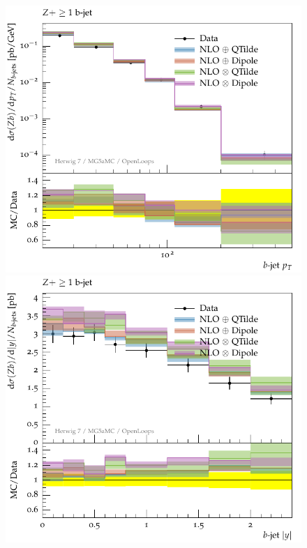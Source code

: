 \documentclass[11pt]{cernrep}
\begin{document}
\begin{figure}[htbp]
\begin{center}
   \includegraphics[scale=0.65]{figs/zbb/herwigzb/atlas-d03-x01-y01.pdf} 
   \includegraphics[scale=0.65]{figs/zbb/herwigzb/atlas-d05-x01-y01.pdf} \\

\end{center}
\end{figure}
\end{document}
